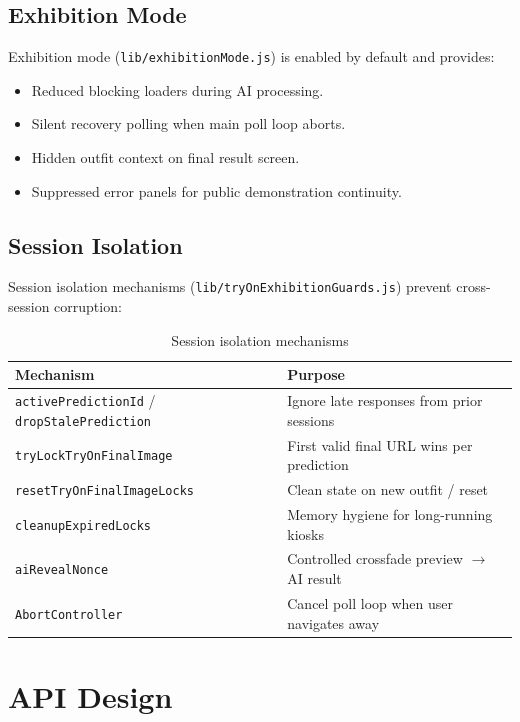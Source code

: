 \subsection{Exhibition Mode}

Exhibition mode (\texttt{lib/exhibitionMode.js}) is enabled by default and provides:
\begin{itemize}[leftmargin=*]
  \item Reduced blocking loaders during AI processing.
  \item Silent recovery polling when main poll loop aborts.
  \item Hidden outfit context on final result screen.
  \item Suppressed error panels for public demonstration continuity.
\end{itemize}

\subsection{Session Isolation}

Session isolation mechanisms (\texttt{lib/tryOnExhibitionGuards.js}) prevent cross-session corruption:

\begin{table}[H]
  \centering
  \caption{Session isolation mechanisms}
  \label{tab:session-isolation}
  \begin{tabular}{@{}lp{10cm}@{}}
    \toprule
    \textbf{Mechanism} & \textbf{Purpose} \\
    \midrule
    \texttt{activePredictionId} / \texttt{dropStalePrediction} & Ignore late responses from prior sessions \\
    \texttt{tryLockTryOnFinalImage} & First valid final URL wins per prediction \\
    \texttt{resetTryOnFinalImageLocks} & Clean state on new outfit / reset \\
    \texttt{cleanupExpiredLocks} & Memory hygiene for long-running kiosks \\
    \texttt{aiRevealNonce} & Controlled crossfade preview $\rightarrow$ AI result \\
    \texttt{AbortController} & Cancel poll loop when user navigates away \\
    \bottomrule
  \end{tabular}
\end{table}

\section{API Design}
\label{sec:api-design}

